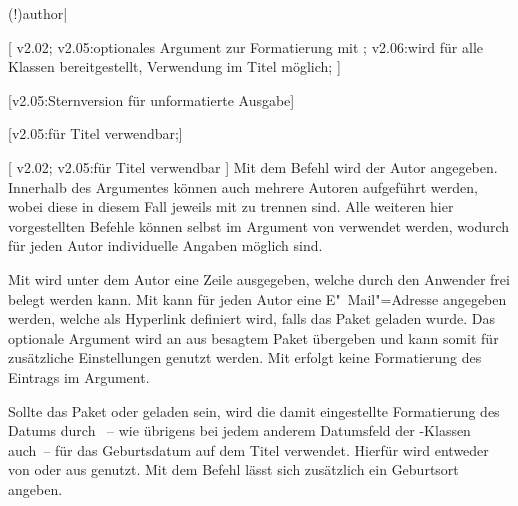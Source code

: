 \begin{DeclareEntity*}{}
\begin{DeclareEntity*}{}
\begin{DeclareEntity*}{}
\begin{Declaration}
  {\Macro(!){author|}}
\begin{Declaration}
  {}
\begin{Declaration}
  {}
  [
    v2.02;
    v2.05:optionales Argument zur Formatierung mit ;
    v2.06:wird für alle Klassen bereitgestellt, Verwendung im Titel möglich;
  ]
\begin{Declaration}
  {}
  [v2.05:Sternversion für unformatierte Ausgabe]
\begin{Declaration}
  {}
\begin{Declaration}
  {}
\begin{Declaration}
  {}
\begin{Declaration}
  {}
\begin{Declaration}
  {}
  [v2.05:für Titel verwendbar;]
\begin{Declaration}
  {}
  [
    v2.02;
    v2.05:für Titel verwendbar
  ]
Mit dem Befehl  wird der Autor angegeben. Innerhalb des 
Argumentes können auch mehrere Autoren aufgeführt werden, wobei diese in diesem 
Fall jeweils mit  zu trennen sind. Alle weiteren hier vorgestellten 
Befehle können selbst im Argument von  verwendet werden, wodurch 
für jeden Autor individuelle Angaben möglich sind.

Mit  wird unter dem Autor eine Zeile ausgegeben, welche 
durch den Anwender frei belegt werden kann. Mit  kann für 
jeden Autor eine E"~Mail"=Adresse angegeben werden, welche als Hyperlink
definiert wird, falls das Paket  geladen wurde. Das optionale 
Argument wird an  aus besagtem Paket übergeben und kann somit 
für zusätzliche Einstellungen genutzt werden. Mit  erfolgt 
keine Formatierung des Eintrags im Argument.

Sollte das Paket  oder  geladen sein, wird 
die damit eingestellte Formatierung des Datums durch ~-- wie 
übrigens bei jedem anderem Datumsfeld der \TUDScript-Klassen auch~-- für das 
Geburtsdatum auf dem Titel verwendet. Hierfür wird entweder  
von  oder  aus  genutzt. Mit 
dem Befehl  lässt sich zusätzlich ein Geburtsort angeben.


\end{Declaration}
\end{Declaration}
\end{Declaration}
\end{Declaration}
\end{Declaration}
\end{Declaration}
\end{Declaration}
\end{Declaration}
\end{Declaration}
\end{Declaration}
\end{DeclareEntity*}
\end{DeclareEntity*}
\end{DeclareEntity*}
